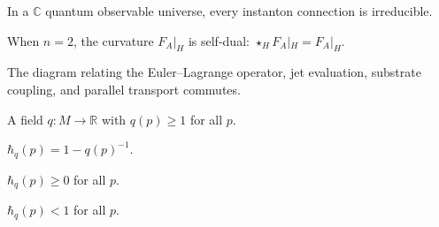 \begin{lemma}
  \label{lem:irreducible-connection}
  \leanok
  In a $\mathbb{C}$ quantum observable universe, every instanton
  connection is irreducible.
\end{lemma}

\begin{proposition}
  \label{prop:self-dual-curvature}
  When $n = 2$, the curvature $F_A|_H$ is self-dual:
  $\star_H F_A|_H = F_A|_H$.
\end{proposition}

\begin{proposition}
  \label{prop:main-commutative-diagram}
  The diagram relating the Euler–Lagrange operator, jet evaluation,
  substrate coupling, and parallel transport commutes.
\end{proposition}

\begin{definition}
  \label{def:substrate-parameter-lean}
  A field $q : M \to \mathbb{R}$ with $q(p) \ge 1$ for all $p$.
\end{definition}

\begin{definition}
  \label{def:quantum-planck-constant}
  $\hbar_q(p) = 1 - q(p)^{-1}$.
\end{definition}

\begin{theorem}[$\hbar_q \ge 0$]
  \label{thm:planck-nonneg}
  \leanok
  $\hbar_q(p) \ge 0$ for all $p$.
\end{theorem}

\begin{theorem}[$\hbar_q < 1$]
  \label{thm:planck-lt-one}
  \leanok
  $\hbar_q(p) < 1$ for all $p$.
\end{theorem}

